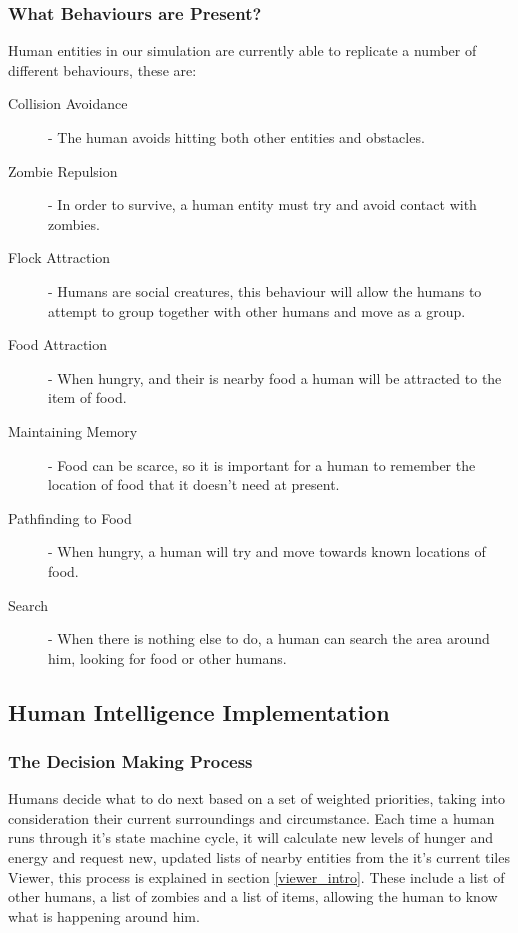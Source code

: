 \subsubsection{What Behaviours are Present?}
Human entities in our simulation are currently able to replicate a number of different behaviours, these are:
\begin{description}
  \item[Collision Avoidance] - The human avoids hitting both other entities and obstacles.
  \item[Zombie Repulsion] - In order to survive, a human entity must try and avoid contact with zombies.
  \item[Flock Attraction] - Humans are social creatures, this behaviour will allow the humans to attempt to group together with other humans and move as a group.
  \item[Food Attraction] - When hungry, and their is nearby food a human will be attracted to the item of food.
  \item[Maintaining Memory] - Food can be scarce, so it is important for a human to remember the location of food that it doesn't need at present.
  \item[Pathfinding to Food] - When hungry, a human will try and move towards known locations of food.
  \item[Search] - When there is nothing else to do, a human can search the area around him, looking for food or other humans.
\end{description}

\subsection{Human Intelligence Implementation}
\subsubsection{The Decision Making Process}
Humans decide what to do next based on a set of weighted priorities, taking into consideration their current surroundings and circumstance. Each time a human runs through it's state machine cycle, it will calculate new levels of hunger and energy and request new, updated lists of nearby entities from the it's current tiles Viewer, this process is explained in section \ref{viewer_intro}. These include a list of other humans, a list of zombies and a list of items, allowing the human to know what is happening around him.

